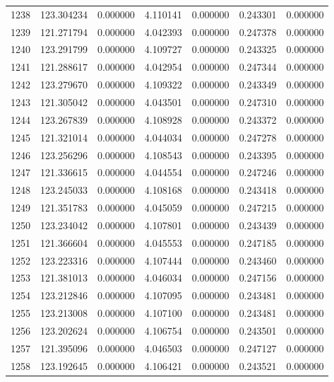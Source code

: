\begin{tabular}{rrrrrrr}
1238 & 123.304234 &    0.000000 &  4.110141 &    0.000000 &    0.243301 &  0.000000 \\
1239 & 121.271794 &    0.000000 &  4.042393 &    0.000000 &    0.247378 &  0.000000 \\
1240 & 123.291799 &    0.000000 &  4.109727 &    0.000000 &    0.243325 &  0.000000 \\
1241 & 121.288617 &    0.000000 &  4.042954 &    0.000000 &    0.247344 &  0.000000 \\
1242 & 123.279670 &    0.000000 &  4.109322 &    0.000000 &    0.243349 &  0.000000 \\
1243 & 121.305042 &    0.000000 &  4.043501 &    0.000000 &    0.247310 &  0.000000 \\
1244 & 123.267839 &    0.000000 &  4.108928 &    0.000000 &    0.243372 &  0.000000 \\
1245 & 121.321014 &    0.000000 &  4.044034 &    0.000000 &    0.247278 &  0.000000 \\
1246 & 123.256296 &    0.000000 &  4.108543 &    0.000000 &    0.243395 &  0.000000 \\
1247 & 121.336615 &    0.000000 &  4.044554 &    0.000000 &    0.247246 &  0.000000 \\
1248 & 123.245033 &    0.000000 &  4.108168 &    0.000000 &    0.243418 &  0.000000 \\
1249 & 121.351783 &    0.000000 &  4.045059 &    0.000000 &    0.247215 &  0.000000 \\
1250 & 123.234042 &    0.000000 &  4.107801 &    0.000000 &    0.243439 &  0.000000 \\
1251 & 121.366604 &    0.000000 &  4.045553 &    0.000000 &    0.247185 &  0.000000 \\
1252 & 123.223316 &    0.000000 &  4.107444 &    0.000000 &    0.243460 &  0.000000 \\
1253 & 121.381013 &    0.000000 &  4.046034 &    0.000000 &    0.247156 &  0.000000 \\
1254 & 123.212846 &    0.000000 &  4.107095 &    0.000000 &    0.243481 &  0.000000 \\
1255 & 123.213008 &    0.000000 &  4.107100 &    0.000000 &    0.243481 &  0.000000 \\
1256 & 123.202624 &    0.000000 &  4.106754 &    0.000000 &    0.243501 &  0.000000 \\
1257 & 121.395096 &    0.000000 &  4.046503 &    0.000000 &    0.247127 &  0.000000 \\
1258 & 123.192645 &    0.000000 &  4.106421 &    0.000000 &    0.243521 &  0.000000 \\

\end{tabular}
